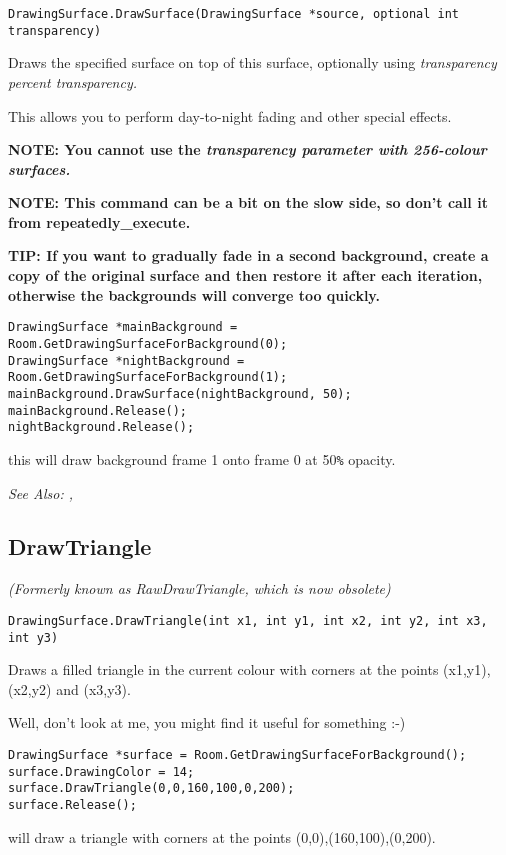 \begin{verbatim}
DrawingSurface.DrawSurface(DrawingSurface *source, optional int transparency)
\end{verbatim}
Draws the specified surface on top of this surface, optionally using \it{transparency}
percent transparency.

This allows you to perform day-to-night fading and other special effects.

\bf{NOTE:} You cannot use the \it{transparency} parameter with 256-colour surfaces.

\bf{NOTE:} This command can be a bit on the slow side, so don't call it from repeatedly_execute.

\bf{TIP:} If you want to gradually fade in a second background, create a copy of
the original surface and then restore it after each iteration, otherwise the backgrounds
will converge too quickly.

\begin{verbatim}
DrawingSurface *mainBackground = Room.GetDrawingSurfaceForBackground(0);
DrawingSurface *nightBackground = Room.GetDrawingSurfaceForBackground(1);
mainBackground.DrawSurface(nightBackground, 50);
mainBackground.Release();
nightBackground.Release();
\end{verbatim}
this will draw background frame 1 onto frame 0 at 50\verb$%$ opacity.

\it{See Also:} ,


\subsection{DrawTriangle}\label{DrawingSurface.DrawTriangle}%

\it{(Formerly known as RawDrawTriangle, which is now obsolete)}

\begin{verbatim}
DrawingSurface.DrawTriangle(int x1, int y1, int x2, int y2, int x3, int y3)
\end{verbatim}
Draws a filled triangle in the current colour with corners at the points
(x1,y1), (x2,y2) and (x3,y3).

Well, don't look at me, you might find it useful for something :-)

\begin{verbatim}
DrawingSurface *surface = Room.GetDrawingSurfaceForBackground();
surface.DrawingColor = 14;
surface.DrawTriangle(0,0,160,100,0,200);
surface.Release();
\end{verbatim}
will draw a triangle with corners at the points (0,0),(160,100),(0,200).

